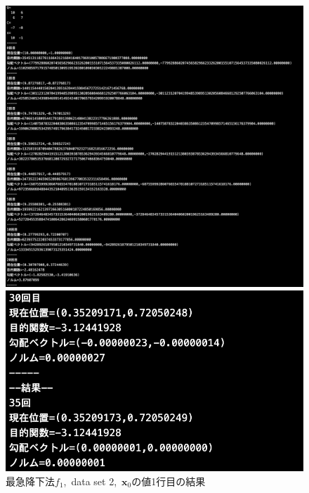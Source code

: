 \documentclass[12pt]{jarticle}
\begin{document}
\clearpage
\begin{figure}[h]
    \begin{center}
        \includegraphics[scale=0.2]{kadai1_1s_out2_1_1.png}
    \end{center}
    \begin{center}
        \includegraphics[scale=0.4]{kadai1_1s_out2_1_2.png}
    \end{center}
    \caption{最急降下法$f_1$,\ data set 2,\ $\boldsymbol{x}_0$の値1行目の結果}
\end{figure}
\end{document}

